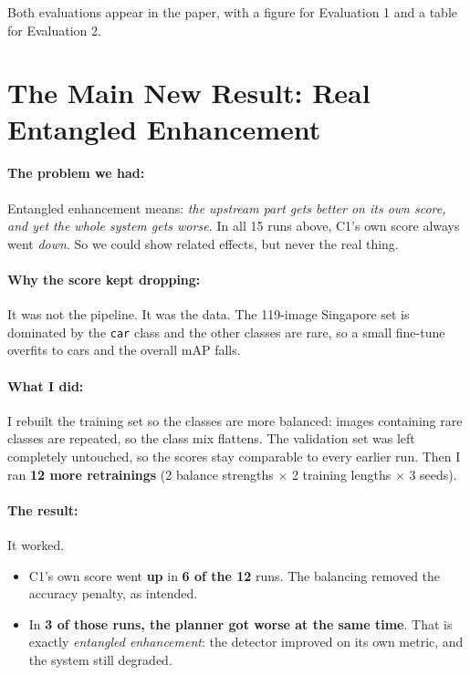 \documentclass[11pt,a4paper]{article}
\begin{document}
Both evaluations appear in the paper, with a figure for Evaluation 1 and a table
for Evaluation 2.

\section{The Main New Result: Real Entangled Enhancement}
\label{sec:strict}

\paragraph{The problem we had:} Entangled enhancement means: \emph{the upstream
part gets better on its own score, and yet the whole system gets worse.} In all
15 runs above, C1's own score always went \emph{down}. So we could show related
effects, but never the real thing.

\paragraph{Why the score kept dropping:} It was not the pipeline. It was the
data. The 119-image Singapore set is dominated by the \texttt{car} class and the
other classes are rare, so a small fine-tune overfits to cars and the overall
mAP falls.

\paragraph{What I did:} I rebuilt the training set so the classes are more
balanced: images containing rare classes are repeated, so the class mix flattens.
The validation set was left completely untouched, so the scores stay comparable
to every earlier run. Then I ran \textbf{12 more retrainings} (2 balance
strengths $\times$ 2 training lengths $\times$ 3 seeds).

\paragraph{The result:} It worked.

\begin{itemize}[noitemsep]
    \item C1's own score went \textbf{up} in \textbf{6 of the 12} runs. The
          balancing removed the accuracy penalty, as intended.
    \item In \textbf{3 of those runs, the planner got worse at the same time}.
          That is exactly \emph{entangled enhancement}: the detector improved on
          its own metric, and the system still degraded.
\end{itemize}
\end{document}
